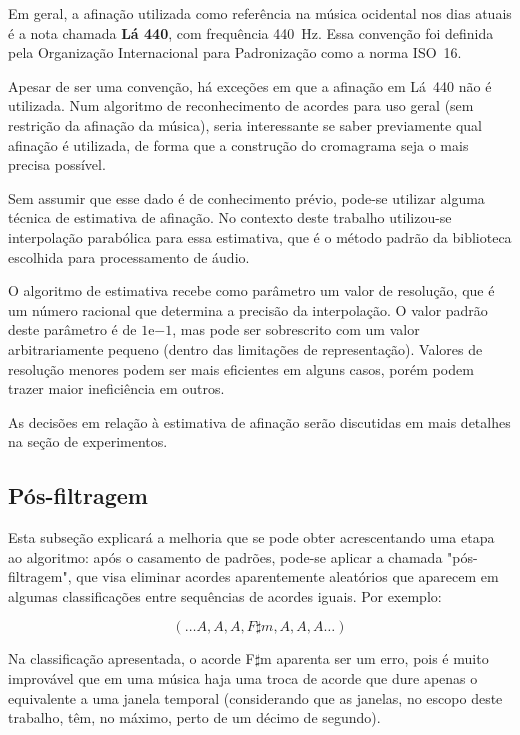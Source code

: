         Em geral, a afinação utilizada como referência na música ocidental nos dias atuais é a nota chamada \textbf{Lá 440}, com frequência 440~Hz. Essa convenção foi definida pela Organização Internacional para Padronização como a norma ISO~16.

        Apesar de ser uma convenção, há exceções em que a afinação em Lá~440 não é utilizada. Num algoritmo de reconhecimento de acordes para uso geral (sem restrição da afinação da música), seria interessante se saber previamente qual afinação é utilizada, de forma que a construção do cromagrama seja o mais precisa possível.
        
        Sem assumir que esse dado é de conhecimento prévio, pode-se utilizar alguma técnica de estimativa de afinação. No contexto deste trabalho utilizou-se interpolação parabólica para essa estimativa, que é o método padrão da biblioteca escolhida para processamento de áudio.
        
        O algoritmo de estimativa recebe como parâmetro um valor de resolução, que é um número racional que determina a precisão da interpolação. O valor padrão deste parâmetro é de $1\textrm{e}{-1}$, mas pode ser sobrescrito com um valor arbitrariamente pequeno (dentro das limitações de representação). Valores de resolução menores podem ser mais eficientes em alguns casos, porém podem trazer maior ineficiência em outros.

        As decisões em relação à estimativa de afinação serão discutidas em mais detalhes na seção de experimentos.

    \subsection{Pós-filtragem}
        Esta subseção explicará a melhoria que se pode obter acrescentando uma etapa ao algoritmo: após o casamento de padrões, pode-se aplicar a chamada "pós-filtragem", que visa eliminar acordes aparentemente aleatórios que aparecem em algumas classificações entre sequências de acordes iguais. Por exemplo:
        
            \[
                (\dots A, A, A, F\sharp m, A, A, A \dots)
            \]

        Na classificação apresentada, o acorde F$\sharp$m aparenta ser um erro, pois é muito improvável que em uma música haja uma troca de acorde que dure apenas o equivalente a uma janela temporal (considerando que as janelas, no escopo deste trabalho, têm, no máximo, perto de um décimo de segundo).
        
